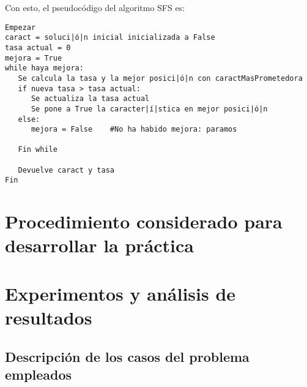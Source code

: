 \documentclass[12pt]{article}
\begin{document}
Con esto, el pseudocódigo del algoritmo SFS es:
\begin{lstlisting}
Empezar
caract = soluci|ó|n inicial inicializada a False
tasa actual = 0
mejora = True
while haya mejora:
   Se calcula la tasa y la mejor posici|ó|n con caractMasPrometedora
   if nueva tasa > tasa actual:
      Se actualiza la tasa actual
      Se pone a True la caracter|í|stica en mejor posici|ó|n
   else:
      mejora = False	#No ha habido mejora: paramos
      
   Fin while
   
   Devuelve caract y tasa
Fin

\end{lstlisting}

\newpage

\section{Procedimiento considerado para desarrollar la práctica}


\section{Experimentos y análisis de resultados}
\subsection{Descripción de los casos del problema empleados}
\end{document}
